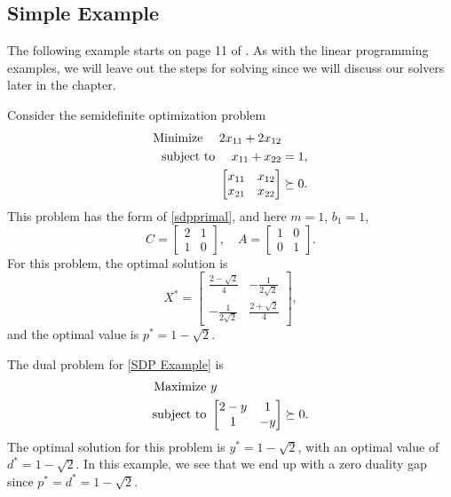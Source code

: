 	\subsection{Simple Example}
	
	The following example starts on page 11 of \cite{BlekhermanGrigoriy;ParriloPabloA.;Thomas2013}. As with the linear programming examples, we will leave out the steps for solving since we will discuss our solvers later in the chapter. 
	
	Consider the semidefinite optimization problem
	\begin{equation} \label{SDP Example}
		\begin{aligned}
			\textnormal{Minimize } \quad 2x_{11} + 2x_{12}& \\
			\textnormal{subject to } \quad x_{11} + x_{22}& = 1,\\
			 \begin{bmatrix}
				x_{11} & x_{12} \\
				x_{21} & x_{22}
			\end{bmatrix} &\succeq 0. 
		\end{aligned}
	\end{equation}
	This problem has the form of \eqref{sdpprimal}, and here $m = 1$, $b_1 = 1$, 
	$$
	C = \begin{bmatrix}
	2 & 1\\ 
	1 & 0
	\end{bmatrix}, \quad
	A = \begin{bmatrix}
	1 & 0 \\
	0 & 1
	\end{bmatrix}.
	$$
	For this problem, the optimal solution is
	$$
	X^* = \begin{bmatrix}
		\frac{2- \sqrt{2}}{4} & -\frac{1}{2\sqrt{2}} \\
		-\frac{1}{2\sqrt{2}} & \frac{2 + \sqrt{2}}{4}
	\end{bmatrix},
	$$
	and the optimal value is $p^* = 1 - \sqrt{2}$. 
	
	The dual problem for \eqref{SDP Example} is 
	\begin{equation}
		\begin{aligned}
			\textnormal{Maximize } &y \\
			\textnormal{subject to } 
		&	\begin{bmatrix}
			2 - y & 1 \\
			1 & -y
			\end{bmatrix} \succeq 0. 
		\end{aligned}
	\end{equation}
	The optimal solution for this problem is $y^* = 1 - \sqrt{2}$, with an optimal value of $d^* = 1 - \sqrt{2}$. In this example, we see that we end up with a zero duality gap since $p^* = d^* = 1 - \sqrt{2}$. 
	
